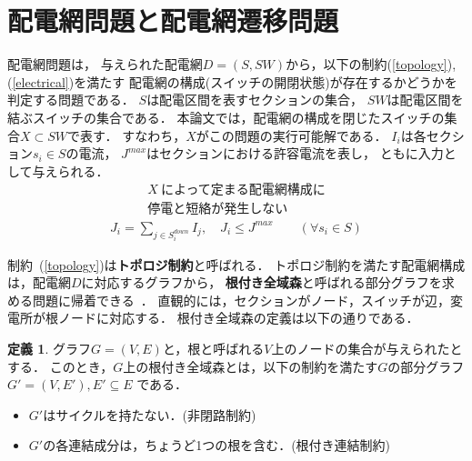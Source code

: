 \section{配電網問題と配電網遷移問題}\label{chap:problem}


配電網問題は，
与えられた配電網$D=(S,SW)$から，以下の制約(\ref{topology}), (\ref{electrical})を満たす
配電網の構成(スイッチの開閉状態)が存在するかどうかを判定する問題である．
$S$は配電区間を表すセクションの集合，
$SW$は配電区間を結ぶスイッチの集合である．
本論文では，配電網の構成を閉じたスイッチの集合$X\subset SW$で表す．
すなわち，$X$がこの問題の実行可能解である．
$I_{i}$は各セクション$s_{i}\in S$の電流，
$J^{max}$はセクションにおける許容電流を表し，
ともに入力として与えられる．
% 
\begin{multline}
 X ~\textrm{によって定まる配電網構成に} \\
 \textrm{停電と短絡が発生しない}   \label{topology} 
\end{multline}
\begin{multline}
J_i = \displaystyle\sum_{j\in S_i^{down}} I_j,
 \quad J_i \leq J^{max}
  \qquad (\forall s_{i}\in S)\label{electrical}
\end{multline}
%

制約~(\ref{topology})は\textbf{トポロジ制約}と呼ばれる．
トポロジ制約を満たす配電網構成は，配電網$D$に対応するグラフから，
\textbf{根付き全域森}と呼ばれる部分グラフを求める問題に帰着できる~\cite{Minato:dnet:netuki}．
直観的には，セクションがノード，スイッチが辺，変電所が根ノードに対応する．
根付き全域森の定義は以下の通りである．

\theoremstyle{definition}
\newtheorem*{definition*}{定義}
\begin{definition*}
  グラフ$G=(V,E)$と，根と呼ばれる$V$上のノードの集合が与えられたとする．
  このとき，$G$上の根付き全域森とは，以下の制約を満たす$G$の部分グラフ
  $G'=(V,E'), E' \subseteq E$ である．
  \begin{itemize}
  \item $G'$はサイクルを持たない．(非閉路制約)
  \item $G'$の各連結成分は，ちょうど1つの根を含む．(根付き連結制約)
  \end{itemize}
\end{definition*}

